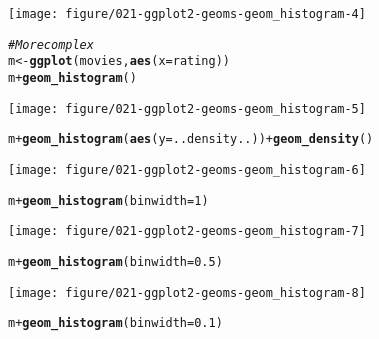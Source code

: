 \documentclass[a4paper,titlepage]{tufte-handout}\usepackage[]{graphicx}\usepackage[]{color}
\makeatletter
\def\maxwidth{ %
  \ifdim\Gin@nat@width>\linewidth
    \linewidth
  \else
    \Gin@nat@width
  \fi
}
\newcommand{\hlnum}[1]{\textcolor[rgb]{0.686,0.059,0.569}{#1}}%
\newcommand{\hlcom}[1]{\textcolor[rgb]{0.678,0.584,0.686}{\textit{#1}}}%
\newcommand{\hlopt}[1]{\textcolor[rgb]{0,0,0}{#1}}%
\newcommand{\hlstd}[1]{\textcolor[rgb]{0.345,0.345,0.345}{#1}}%
\newcommand{\hlkwb}[1]{\textcolor[rgb]{0.69,0.353,0.396}{#1}}%
\newcommand{\hlkwc}[1]{\textcolor[rgb]{0.333,0.667,0.333}{#1}}%
\newcommand{\hlkwd}[1]{\textcolor[rgb]{0.737,0.353,0.396}{\textbf{#1}}}%
\newenvironment{kframe}{%
 \def\at@end@of@kframe{}%
 \ifinner\ifhmode%
  \def\at@end@of@kframe{\end{minipage}}%
  \begin{minipage}{\columnwidth}%
 \fi\fi%
 \def\FrameCommand##1{\hskip\@totalleftmargin \hskip-\fboxsep
 \colorbox{shadecolor}{##1}\hskip-\fboxsep
     \hskip-\linewidth \hskip-\@totalleftmargin \hskip\columnwidth}%
 \MakeFramed {\advance\hsize-\width
   \@totalleftmargin\z@ \linewidth\hsize
   \@setminipage}}%
 {\par\unskip\endMakeFramed%
 \at@end@of@kframe}
\newenvironment{knitrout}{}{} %
\makeatother
\begin{document}
\begin{knitrout}
\begin{kframe}
{\ttfamily\noindent\color{warningcolor}{\#\# Warning in loop\_apply(n, do.ply): position\_stack requires constant width: output may be incorrect}}\end{kframe}
\texttt{[image: figure/021-ggplot2-geoms-geom\_histogram-4]} 
\begin{kframe}\begin{alltt}
\hlcom{# More complex}
\hlstd{m} \hlkwb{<-} \hlkwd{ggplot}\hlstd{(movies,} \hlkwd{aes}\hlstd{(}\hlkwc{x}\hlstd{=rating))}
\hlstd{m} \hlopt{+} \hlkwd{geom_histogram}\hlstd{()}
\end{alltt}


{\ttfamily\noindent\color{warningcolor}{\#\# Warning in loop\_apply(n, do.ply): position\_stack requires constant width: output may be incorrect}}\end{kframe}
\texttt{[image: figure/021-ggplot2-geoms-geom\_histogram-5]} 
\begin{kframe}\begin{alltt}
\hlstd{m} \hlopt{+} \hlkwd{geom_histogram}\hlstd{(}\hlkwd{aes}\hlstd{(}\hlkwc{y} \hlstd{= ..density..))} \hlopt{+} \hlkwd{geom_density}\hlstd{()}
\end{alltt}


{\ttfamily\noindent\color{warningcolor}{\#\# Warning in loop\_apply(n, do.ply): position\_stack requires constant width: output may be incorrect}}\end{kframe}
\texttt{[image: figure/021-ggplot2-geoms-geom\_histogram-6]} 
\begin{kframe}\begin{alltt}
\hlstd{m} \hlopt{+} \hlkwd{geom_histogram}\hlstd{(}\hlkwc{binwidth} \hlstd{=} \hlnum{1}\hlstd{)}
\end{alltt}
\end{kframe}
\texttt{[image: figure/021-ggplot2-geoms-geom\_histogram-7]} 
\begin{kframe}\begin{alltt}
\hlstd{m} \hlopt{+} \hlkwd{geom_histogram}\hlstd{(}\hlkwc{binwidth} \hlstd{=} \hlnum{0.5}\hlstd{)}
\end{alltt}
\end{kframe}
\texttt{[image: figure/021-ggplot2-geoms-geom\_histogram-8]} 
\begin{kframe}\begin{alltt}
\hlstd{m} \hlopt{+} \hlkwd{geom_histogram}\hlstd{(}\hlkwc{binwidth} \hlstd{=} \hlnum{0.1}\hlstd{)}
\end{alltt}



\end{kframe}
\end{knitrout}
\end{document}

